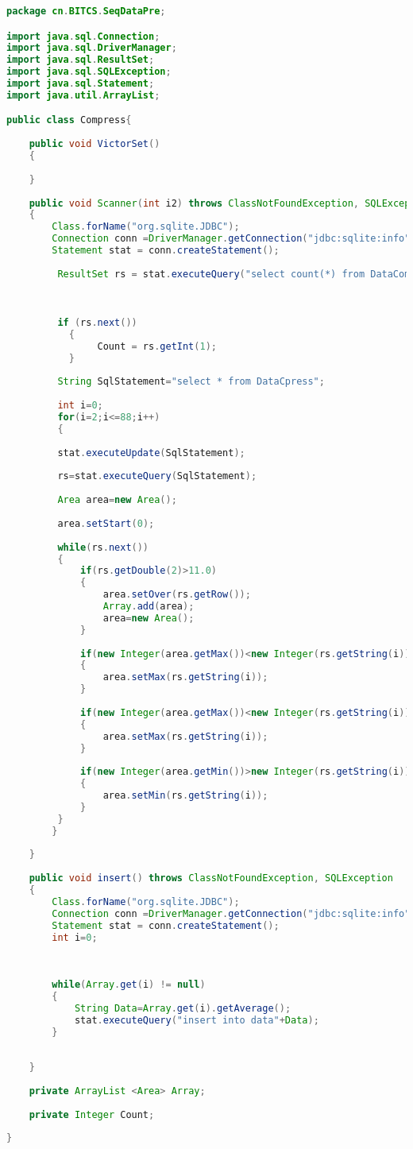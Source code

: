 \begin{lstlisting}[language = Java]
package cn.BITCS.SeqDataPre;

import java.sql.Connection;
import java.sql.DriverManager;
import java.sql.ResultSet;
import java.sql.SQLException;
import java.sql.Statement;
import java.util.ArrayList;

public class Compress{
	
	public void VictorSet()
	{
		
	}
	
	public void Scanner(int i2) throws ClassNotFoundException, SQLException
	{
		Class.forName("org.sqlite.JDBC");
		Connection conn =DriverManager.getConnection("jdbc:sqlite:info");
		Statement stat = conn.createStatement();
		
	     ResultSet rs = stat.executeQuery("select count(*) from DataCompress" );
	     
	     

	     if (rs.next()) 
	       {
	            Count = rs.getInt(1); 
	       }
	     
	     String SqlStatement="select * from DataCpress";
	     
	     int i=0;
	     for(i=2;i<=88;i++)
	     {
	     
	     stat.executeUpdate(SqlStatement);
	     
	     rs=stat.executeQuery(SqlStatement);
	     
	     Area area=new Area();
	     
	     area.setStart(0);
	     
	     while(rs.next())
	     {
	    	 if(rs.getDouble(2)>11.0)
	    	 {
	    		 area.setOver(rs.getRow());
	    		 Array.add(area);
	    		 area=new Area();
	    	 }
	    	 
	    	 if(new Integer(area.getMax())<new Integer(rs.getString(i)))
	    	 {
	    		 area.setMax(rs.getString(i));
	    	 }
	    	 
	    	 if(new Integer(area.getMax())<new Integer(rs.getString(i)));
	    	 {
	    		 area.setMax(rs.getString(i));
	    	 }
	    	 
	    	 if(new Integer(area.getMin())>new Integer(rs.getString(i)))
	    	 {
	    		 area.setMin(rs.getString(i));
	    	 }
	     }
	    }
	     
	}
	
	public void insert() throws ClassNotFoundException, SQLException
	{
		Class.forName("org.sqlite.JDBC");
		Connection conn =DriverManager.getConnection("jdbc:sqlite:info");
		Statement stat = conn.createStatement();
		int i=0;
		
		
		
		while(Array.get(i) != null)
		{
			String Data=Array.get(i).getAverage();
			stat.executeQuery("insert into data"+Data);
		}
		
		
	}
	
	private ArrayList <Area> Array;
	
	private Integer Count;
	
}
\end{lstlisting}

